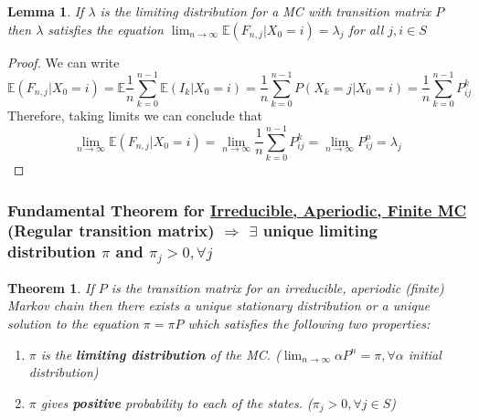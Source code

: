 \documentclass[11pt,a4paper]{article}
\newtheorem{theorem}{Theorem}
\newtheorem{lemma}{Lemma}
\begin{document}
\begin{lemma}
    If $\lambda$ is the limiting distribution for a MC with transition matrix $P$ then $\lambda$ satisfies the equation $\lim_{n \rightarrow \infty}\mathbb{E}(F_{n,j}|X_0=i)=\lambda_j$ for all $j,i\in S$
\end{lemma}
\begin{proof}
    We can write $$\mathbb{E}(F_{n,j}|X_0=i)=\mathbb{E}\frac{1}{n}\sum_{k=0}^{n-1}\mathbb{E}(I_k|X_0=i)=\frac{1}{n}\sum_{k=0}^{n-1}P(X_k=j|X_0=i)=\frac{1}{n}\sum_{k=0}^{n-1}P_{ij}^k$$
    Therefore, taking limits we can conclude that $$\lim_{n \rightarrow \infty}\mathbb{E}(F_{n,j}|X_0=i)=\lim_{n \rightarrow \infty}\frac{1}{n}\sum_{k=0}^{n-1}P_{ij}^k=\lim_{n \rightarrow \infty}P_{ij}^n=\lambda_j$$
\end{proof}

\subsubsection{Fundamental Theorem for \underline{Irreducible, Aperiodic, Finite MC} (Regular transition matrix) $\Rightarrow $ $\exists$ unique limiting distribution $\pi$ and $\pi_j>0,\forall j$}
\begin{theorem}
    If $P$ is the transition matrix for an irreducible, aperiodic (finite) Markov chain then there exists a unique stationary distribution or a unique solution to the equation $\pi=\pi P$ which satisfies the following two properties:
    \begin{enumerate}[(1)]
        \item $\pi$ is the \textbf{limiting distribution} of the MC. ($\lim_{n \rightarrow \infty}\alpha P^n=\pi,\forall \alpha$ initial distribution)
        \item $\pi$ gives \textbf{positive} probability to each of the states. ($\pi_j>0,\forall j\in S$)
    \end{enumerate}
\end{theorem}
\end{document}
